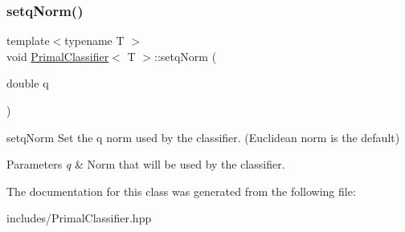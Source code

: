 \subsubsection{\texorpdfstring{setq\+Norm()}{setqNorm()}}
{\footnotesize\ttfamily template$<$typename T $>$ \\
void \hyperlink{class_primal_classifier}{Primal\+Classifier}$<$ T $>$\+::setq\+Norm (\begin{DoxyParamCaption}\item[{double}]{q }\end{DoxyParamCaption})\hspace{0.3cm}{\ttfamily [inline]}}



setq\+Norm Set the q norm used by the classifier. (Euclidean norm is the default) 


\begin{DoxyParams}{Parameters}
{\em q} & Norm that will be used by the classifier. \\
\hline
\end{DoxyParams}


The documentation for this class was generated from the following file\+:\begin{DoxyCompactItemize}
\item 
includes/Primal\+Classifier.\+hpp\end{DoxyCompactItemize}
